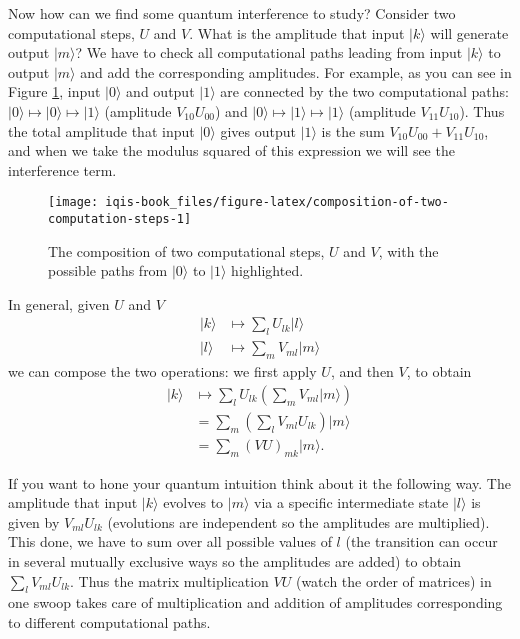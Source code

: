\documentclass[fleqn]{article}
\begin{document}
Now how can we find some quantum interference to study?
Consider two computational steps, \(U\) and \(V\).
What is the amplitude that input \(|k\rangle\) will generate output \(|m\rangle\)?
We have to check all computational paths leading from input \(|k\rangle\) to output \(|m\rangle\) and add the corresponding amplitudes.
For example, as you can see in Figure \ref{fig:composition-of-two-computation-steps}, input \(|0\rangle\) and output \(|1\rangle\) are connected by the two computational paths: \(|0\rangle\mapsto|0\rangle\mapsto|1\rangle\) (amplitude \(V_{10}U_{00}\)) and \(|0\rangle\mapsto|1\rangle\mapsto|1\rangle\) (amplitude \(V_{11}U_{10}\)).
Thus the total amplitude that input \(|0\rangle\) gives output \(|1\rangle\) is the sum \(V_{10}U_{00}+V_{11}U_{10}\), and when we take the modulus squared of this expression we will see the interference term.



\begin{figure}[H]

{\centering \texttt{[image: iqis-book\_files/figure-latex/composition-of-two-computation-steps-1]} 

}

\caption{The composition of two computational steps, \(U\) and \(V\), with the possible paths from \(|0\rangle\) to \(|1\rangle\) highlighted.}\label{fig:composition-of-two-computation-steps}
\end{figure}

In general, given \(U\) and \(V\)
\[
  \begin{aligned}
    |k\rangle
    &\longmapsto
    \sum_l U_{lk}|l\rangle
  \\|l\rangle
    &\longmapsto
    \sum_m V_{ml}|m\rangle
  \end{aligned}
\]
we can compose the two operations: we first apply \(U\), and then \(V\), to obtain
\[
  \begin{aligned}
    |k\rangle
    &\longmapsto
    \sum_l U_{lk} \left(
      \sum_m V_{ml}|m\rangle
    \right)
  \\&=
    \sum_m \left(
      \sum_l V_{ml}U_{lk}
    \right) |m\rangle
  \\&=
    \sum_m (VU)_{mk} |m\rangle.
  \end{aligned}
\]

If you want to hone your quantum intuition think about it the following way.
The amplitude that input \(|k\rangle\) evolves to \(|m\rangle\) via a specific intermediate state \(|l\rangle\) is given by \(V_{ml}U_{lk}\) (evolutions are independent so the amplitudes are multiplied).
This done, we have to sum over all possible values of \(l\) (the transition can occur in several mutually exclusive ways so the amplitudes are added) to obtain \(\sum_l V_{ml}U_{lk}\).
Thus the matrix multiplication \(VU\) (watch the order of matrices) in one swoop takes care of multiplication and addition of amplitudes corresponding to different computational paths.
\end{document}
